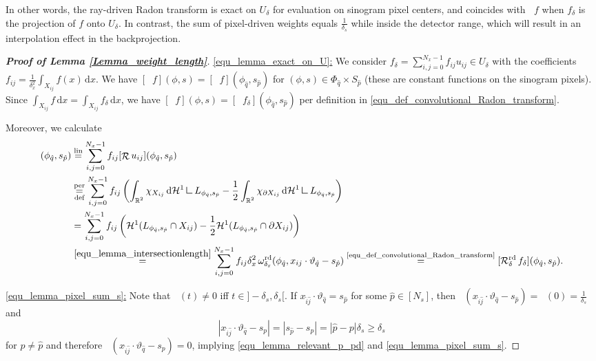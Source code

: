 \documentclass[11pt,reqno]{amsart}
\DeclareMathOperator{\RR}{\mathbb{R}}
\newcommand{\sumx}{\sum_{i,j=0}^{N_x-1}}
\newcommand{\mres}{\mathbin{\vrule height 1.6ex depth 0pt width
0.13ex\vrule height 0.13ex depth 0pt width 1.3ex}}
\DeclareMathOperator{\Radon}{\mathcal{R}}
\DeclareMathOperator{\RayRadon}{\mathcal{R}^\mathrm{rd}_{\delta}}
\DeclareMathOperator{\RayWeight}{\omega^\mathrm{rd}_{\delta_\mathit{x}}}
\DeclareMathOperator{\PixelWeight}{\omega^\mathrm{pd}_{\delta_\mathit{s}}}
\newcommand{\dd}[1]{\,\mathrm{d}{#1}}
\numberwithin{theorem}{section}
\theoremstyle{remark}
\begin{document}
In other words, the ray-driven Radon transform is exact on $U_\delta$ for evaluation on sinogram pixel centers, and coincides with $\RayRadon f$ when $f_\delta$ is the projection of $f$ onto $U_\delta$. In contrast, the sum of pixel-driven weights equals $\frac{1}{\delta_s}$ while inside the detector range, which will result in an interpolation effect in the backprojection.

\begin{proof}[\textbf{Proof of Lemma \ref{Lemma_weight_length}}]
\underline{\eqref{equ_lemma_exact_on_U}:}  We consider $f_\delta=\sumx f_{ij} u_{ij}\in U_\delta$ with the coefficients $f_{ij}= \frac{1}{\delta_x^2}\int_{X_{ij}}f(x) \dd x$. 
We have $[\RayRadon f] (\phi,s)=[\RayRadon f] (\phi_{\hat q},s_{\hat p})$ for $(\phi,s)\in \Phi_{\hat q}\times S_{\hat p}$ (these  are constant functions on the sinogram pixels). Since $\int_{X_{ij}}f \dd x = \int_{X_{ij}}f_\delta \dd x$, we have  $[\RayRadon f] (\phi,s)=[\RayRadon f_\delta] (\phi_{\hat q},s_{\hat p})$ per definition in \eqref{equ_def_convolutional_Radon_transform}.

Moreover, we calculate
\begin{align*}
[\Radon f_\delta](\phi_{\hat q},s_{\hat p}) & \overset{\text{lin}}{=} \sumx f_{ij} [\Radon u_{ij}](\phi_{\hat q},s_{\hat p})
\\ 
&\underset{\text{def}}{\overset{\text{per}}{=}} \sumx f_{ij} \left ( \int_{\RR^2} \chi_{X_{ij}} \dd {\mathcal{H}^1 \mres L_{\phi_{\hat q},s_{\hat p}}}- \frac 12 \int_{\RR^2} \chi_{\partial X_{ij}} \dd {\mathcal{H}^1 \mres {L_{\phi_{\hat q},s_{\hat p}}}} \right)
\\
&
=\sumx f_{ij}\left ( \mathcal{H}^1(L_{\phi_{\hat q},s_{\hat p}} \cap X_{ij})- \frac{1}{2}\mathcal{H}^1(L_{\phi_{\hat q},s_{\hat p}} \cap \partial X_{ij}) \right)
\\
& \overset{\eqref{equ_lemma_intersectionlength}}{=} \sumx f_{ij} \delta_x^2\RayWeight (\phi_{\hat q},x_{ij}\cdot\vartheta_{\hat q} -s_{\hat p})
 \underset{}{\overset{\text{\eqref{equ_def_convolutional_Radon_transform}}}{=}} [\RayRadon f_\delta](\phi_{\hat q},s_{\hat p}) .
\end{align*}


\underline{ \eqref{equ_lemma_pixel_sum_s}:} Note that $ \PixelWeight(t)\neq 0$ iff  $t\in{]-\delta_s,\delta_s[}$.
If $x_{\hat i \hat j}\cdot\vartheta_{\hat q}=s_{\hat p}$ for some $\hat p \in [N_s]$, then $\PixelWeight(x_{\hat i \hat j}\cdot \vartheta_{\hat q}-s_{\hat p})=\PixelWeight(0)=\frac{1}{\delta_s}$ and 
\begin{equation}
|x_{\hat i \hat j}\cdot\vartheta_{\hat q}-s_{p}|=|s_{\hat p}-s_p| = |\hat p- p|\delta_s\geq \delta_s
\end{equation}
 for $p\neq \hat p$ and therefore $\PixelWeight(x_{\hat i \hat j}\cdot \vartheta_{\hat q}-s_p)=0$, implying \eqref{equ_lemma_relevant_p_pd} and \eqref{equ_lemma_pixel_sum_s}.


\end{proof}
\end{document}
